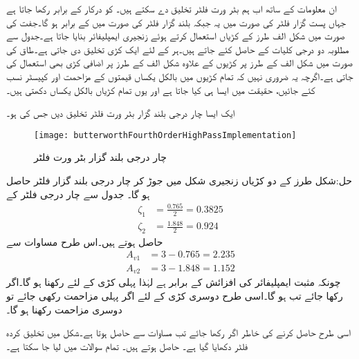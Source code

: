 ان معلومات کے ساتھ اب ہم بٹر ورت فلٹر تخلیق دے سکتے ہیں۔ کو درکار  کے برابر رکھا جاتا ہے جہاں پست گزار فلٹر کی صورت میں یہ  جبکہ بلند گزار فلٹر کی صورت میں  کے برابر ہو گا۔جفت  کی صورت میں شکل  الف طرز کے  کڑیاں استعمال کرتے ہوئے زنجیری ایمپلیفائر بنایا جاتا ہے۔جدول  سے مطلوبہ دو درجی کلیات    کے  حاصل کئے جاتے ہیں۔ہر  کے لئے ایک کڑی تخلیق دی جاتی ہے۔طاق  کی صورت میں شکل  الف کے طرز پر  کڑیوں کے علاوہ شکل  الف کے طرز پر اضافی کڑی بھی استعمال کی جاتی ہے۔اگرچہ یہ ضروری نہیں کہ تمام کڑیوں میں بالکل یکساں قیمتوں کے مزاحمت اور کپیسٹر نسب کئے جائیں، حقیقت میں ایسا ہی کیا جاتا ہے اور یوں تمام کڑیاں بالکل یکساں دکھتی ہیں۔

ایک ایسا چار درجی بلند گزار بٹر ورت فلٹر تخلیق دیں جس کی  ہو۔

\begin{figure}
\centering
\texttt{[image: butterworthFourthOrderHighPassImplementation]}
\caption{چار درجی بلند گزار بٹر ورت فلٹر}
\label{شکل_تعددی_ردعمل_بٹر_ورت_فلٹر_بلند_گزار}
\end{figure}
حل:شکل  طرز کے دو کڑیاں زنجیری شکل میں جوڑ کر چار درجی بلند گزار فلٹر حاصل ہو گا۔ جدول  سے چار درجی فلٹر کے
\begin{align*}
\zeta_1&=\frac{0.765}{2}=0.3825\\
\zeta_2&=\frac{1.848}{2}=0.924
\end{align*} 
حاصل ہوتے ہیں۔اس طرح مساوات  سے
\begin{align*}
A_{v1}&=3-0.765=2.235\\
A_{v2}&=3-1.848=1.152
\end{align*}
چونکہ مثبت ایمپلیفائر کی افزائش  کے برابر ہے لہٰذا پہلی کڑی کے لئے  رکھنا ہو گا۔اگر  رکھا جائے تب  ہو گا۔اسی طرح دوسری کڑی کے لئے  اگر پہلی مزاحمت  رکھی جائے تو دوسری مزاحمت  رکھنا ہو گا۔

اسی طرح  حاصل کرنے کی خاطر اگر  رکھا جائے تب مساوات  سے   حاصل ہوتا ہے۔شکل  میں تخلیق کردہ فلٹر دکھایا گیا ہے۔  
حاصل ہوتے ہیں۔
\newpage
{}
تمام سوالات میں  لیا جا سکتا ہے۔

